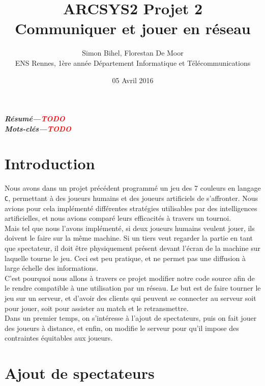 \documentclass[a4paper]{article}
\providecommand{\resume}[1]{\textbf{\textit{Résumé---#1}}}
\providecommand{\keywords}[1]{\textbf{\textit{Mots-clés---#1}}}
\newcommand{\TODO}{\textcolor{red}{\textbf{TODO}}}
\begin{document}
\title{ARCSYS2 Projet 2%
	\\ Communiquer et jouer en réseau}
\author{Simon Bihel, Florestan De Moor%
	 \\ ENS Rennes, 1ère année Département Informatique et Télécommunications}
\date{05 Avril 2016}

\maketitle

\resume{\TODO}\\

\keywords{\TODO}

\section*{Introduction}


Nous avons dans un projet précédent programmé un jeu des 7 couleurs en langage \texttt{C}, permettant à des joueurs humains et des joueurs artificiels de s'affronter. Nous avions pour cela implémenté différentes stratégies utilisables par des intelligences artificielles, et nous avions comparé leurs efficacités à travers un tournoi. \\

Mais tel que nous l'avons implémenté, si deux joueurs humains veulent jouer, ils doivent le faire sur la même machine. Si un tiers veut regarder la partie en tant que spectateur, il doit être physiquement présent devant l'écran de la machine sur laquelle tourne le jeu. Ceci est peu pratique, et ne permet pas une diffusion à large échelle des informations. \\

C'est pourquoi nous allons à travers ce projet modifier notre code source afin de le rendre compatible à une utilisation par un réseau. Le but est de faire tourner le jeu sur un serveur, et d'avoir des clients qui peuvent se connecter au serveur soit pour jouer, soit pour assister au match et le retransmettre. \\

Dans un premier temps, on s'intéresse à l'ajout de spectateurs, puis on fait jouer des joueurs à distance, et enfin, on modifie le serveur pour qu'il impose des contraintes équitables aux joueurs.

\section{Ajout de spectateurs}
\end{document}
